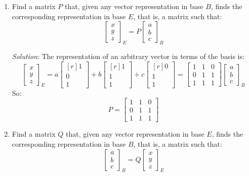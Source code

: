 \documentclass[12pt]{article}
\begin{document}
\begin{enumerate}
\item Find a matrix $P$ that, given any vector representation in base $B$, finds the corresponding representation in base $E$, that is, a matrix such that:
\[
\begin{bmatrix}x\\y\\z\end{bmatrix}_E = P \begin{bmatrix}a\\b\\c\end{bmatrix}_B
\]

\emph{Solution}:
The representation of an arbitrary vector in terms of the basis is:
\[
\begin{bmatrix}x\\y\\z\end{bmatrix}_E=
a\begin{bmatrix*}[r] 1\\ 0\\ 1\end{bmatrix*}+
b\begin{bmatrix*}[r] 1\\ 1\\ 1\end{bmatrix*}+
c\begin{bmatrix*}[r] 0\\ 1\\ 1\end{bmatrix*}=
\begin{bmatrix*}1&1&0\\0&1&1\\1&1&1\end{bmatrix*}
\begin{bmatrix}a\\b\\c\end{bmatrix}_B
\]
So:
\[
P = \begin{bmatrix*}1&1&0\\0&1&1\\1&1&1\end{bmatrix*}
\]
\proofend

\item Find a matrix $Q$ that, given any vector representation in base $E$, finds the corresponding representation in base $B$, that is, a matrix such that:
\[
\begin{bmatrix}a\\b\\c\end{bmatrix}_B = Q \begin{bmatrix}x\\y\\z\end{bmatrix}_E 
\]


\end{enumerate}
\end{document}
